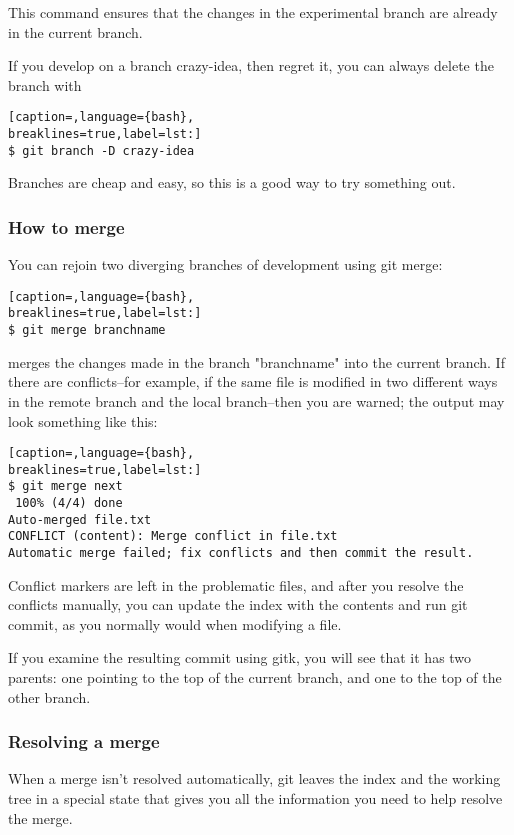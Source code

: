 This command ensures that the changes in the experimental branch are already in
the current branch.

If you develop on a branch crazy-idea, then regret it, you can always delete
the branch with

\lstset{basicstyle=\scriptsize, numbers=none, captionpos=b, tabsize=4}
\begin{lstlisting}[caption=,language={bash},
breaklines=true,label=lst:]
$ git branch -D crazy-idea
\end{lstlisting}

Branches are cheap and easy, so this is a good way to try something out.

\subsubsection{How to merge}
You can rejoin two diverging branches of development using git merge:

\lstset{basicstyle=\scriptsize, numbers=none, captionpos=b, tabsize=4}
\begin{lstlisting}[caption=,language={bash},
breaklines=true,label=lst:]
$ git merge branchname
\end{lstlisting}

merges the changes made in the branch "branchname" into the current branch. If
there are conflicts--for example, if the same file is modified in two different
ways in the remote branch and the local branch--then you are warned; the output
may look something like this:

\lstset{basicstyle=\scriptsize, numbers=none, captionpos=b, tabsize=4}
\begin{lstlisting}[caption=,language={bash},
breaklines=true,label=lst:]
$ git merge next
 100% (4/4) done
Auto-merged file.txt
CONFLICT (content): Merge conflict in file.txt
Automatic merge failed; fix conflicts and then commit the result.
\end{lstlisting}

Conflict markers are left in the problematic files, and after you resolve the
conflicts manually, you can update the index with the contents and run git
commit, as you normally would when modifying a file.

If you examine the resulting commit using gitk, you will see that it has two
parents: one pointing to the top of the current branch, and one to the top of
the other branch.

\subsubsection{Resolving a merge}
When a merge isn't resolved automatically, git leaves the index and the working
tree in a special state that gives you all the information you need to help
resolve the merge.

